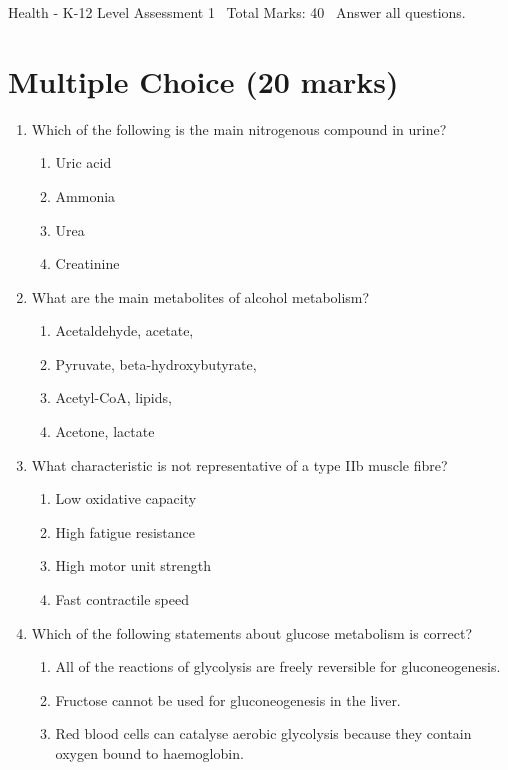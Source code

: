 \documentclass[12pt]{article}
\begin{document}
\begin{center}
Health - K-12 Level Assessment 1 \
Total Marks: 40 \
Answer all questions.
\end{center}

\section*{Multiple Choice (20 marks)}
\begin{enumerate}[label=\arabic*.]
\item Which of the following is the main nitrogenous compound in urine?
\begin{enumerate}[label=(\alph*)]
    \item Uric acid
    \item Ammonia
    \item Urea
    \item Creatinine
\end{enumerate}
\item What are the main metabolites of alcohol metabolism?
\begin{enumerate}[label=(\alph*)]
    \item Acetaldehyde, acetate,
    \item Pyruvate, beta-hydroxybutyrate,
    \item Acetyl-CoA, lipids,
    \item Acetone, lactate
\end{enumerate}
\item What characteristic is not representative of a type IIb muscle fibre?
\begin{enumerate}[label=(\alph*)]
    \item Low oxidative capacity
    \item High fatigue resistance
    \item High motor unit strength
    \item Fast contractile speed
\end{enumerate}
\item Which of the following statements about glucose metabolism is correct?
\begin{enumerate}[label=(\alph*)]
    \item All of the reactions of glycolysis are freely reversible for gluconeogenesis.
    \item Fructose cannot be used for gluconeogenesis in the liver.
    \item Red blood cells can catalyse aerobic glycolysis because they contain oxygen bound to haemoglobin.

\end{enumerate}
\end{enumerate}
\end{document}
